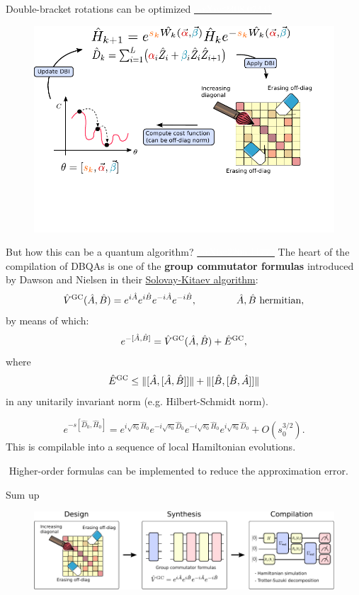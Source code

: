 \documentclass[aspectratio=169, 8pt, xcolor={svgnames}]{beamer}
\begin{document}
\begin{frame}{Double-bracket rotations can be optimized \hfill \href{https://arxiv.org/abs/2408.07431}{\textcolor{white}{\faBook\,\,arXiv:2408.07431}}}
\begin{center}
\begin{figure}
   \includegraphics[width=1\textwidth]{figures/dbi_scheme_ink.pdf}
\end{figure}
\end{center}
\end{frame}

\begin{frame}{But how this can be a quantum algorithm? \hfill \href{https://arxiv.org/abs/2206.11772}{\textcolor{white}{\faBook\,\,arXiv:2206.11772}}}
The heart of the compilation of DBQAs is one of the \textbf{group commutator formulas} introduced
by Dawson and Nielsen in their \href{https://arxiv.org/abs/quant-ph/0505030}{Solovay-Kitaev algorithm}:
$$ \hat{V}^{\rm GC}(\hat{A}, \hat{B}) = e^{i\hat{A}} e^{i\hat{B}} e^{-i\hat{A}} e^{-i\hat{B}}, \qquad \qquad \hat{A}, \hat{B} \,\,\text{hermitian},$$
by means of which:
$$ e^{-[\hat{A}, \hat{B}]} = \hat{V}^{\rm GC}(\hat{A}, \hat{B}) + \hat{E}^{\rm GC}, $$
where 
$$  \hat{E}^{\rm GC} \leq \| [ \hat{A}, [\hat{A}, \hat{B}]] \| + \| [ \hat{B}, [\hat{B}, \hat{A}]] \|$$
in any unitarily invariant norm (e.g. Hilbert-Schmidt norm).

\begin{tcolorbox}[colback=red!15, title=How about DBI?]
$$ e^{- s [\hat{D}_0, \hat{H}_0]} = e^{i \sqrt{s_0}\hat{H}_0} 
e^{-i \sqrt{s_0}\hat{D}_0} e^{-i \sqrt{s_0}\hat{H}_0} e^{i \sqrt{s_0}\hat{D}_0} + O(s_0^{3/2}).$$
This is compilable into a sequence of local Hamiltonian evolutions.
\end{tcolorbox}
\faExclamationCircle\,\,Higher-order formulas can be implemented to reduce the approximation error.
\end{frame}

\begin{frame}{Sum up}
\begin{figure}
   \includegraphics[width=1\textwidth]{figures/3_phases_dbqa.pdf}
\end{figure}
\end{frame}
\end{document}
